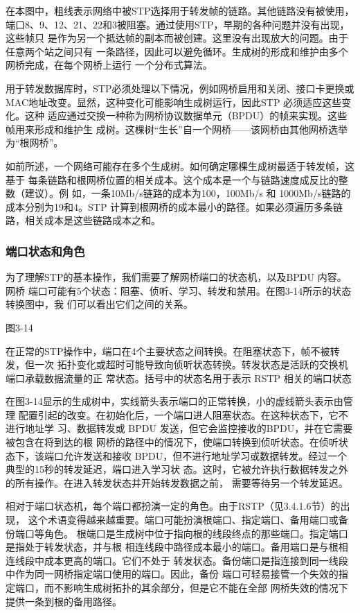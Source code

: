 在本图中，粗线表示网络中被STP选择用于转发帧的链路。其他链路没有被使用，
端口8、9、12、21、22和3被阻塞。通过使用STP，早期的各种问题并没有出现，这些帧只
是作为另一个抵达帧的副本而被创建。这里没有出现放大的问题。由于任意两个站之间只有
一条路径，因此可以避免循环。生成树的形成和维护由多个网桥完成，在每个网桥上运行
一个分布式算法。

用于转发数据库时，STP必须处理以下情况，例如网桥启用和关闭、接口卡更换或
MAC地址改变。显然，这种变化可能影响生成树运行，因此STP 必须适应这些变化。这种
适应通过交换一种称为网桥协议数据单元（BPDU）的帧来实现。这些帧用来形成和维护生
成树。这棵树“生长”自一个网桥——该网桥由其他网桥选举为“根网桥”。

如前所述，一个网络可能存在多个生成树。如何确定哪棵生成树最适于转发帧，这基于
每条链路和根网桥位置的相关成本。这个成本是一个与链路速度成反比的整数（建议）。例
如，一条10Mb/s链路的成本为100，100Mb/s 和 1000Mb/s链路的成本分别为19和4。STP
计算到根网桥的成本最小的路径。如果必须遍历多条链路，相关成本是这些链路成本之和。

\subsubsection{端口状态和角色}

为了理解STP的基本操作，我们需要了解网桥端口的状态机，以及BPDU 内容。网桥
端口可能有5个状态：阻塞、侦听、学习、转发和禁用。在图3-14所示的状态转换图中，我
们可以看出它们之间的关系。

图3-14

在正常的STP操作中，端口在4个主要状态之间转换。在阻塞状态下，帧不被转发，但一次
拓扑变化或超时可能导致向侦听状态转换。转发状态是活跃的交换机端口承载数据流量的正
常状态。括号中的状态名用于表示 RSTP 相关的端口状态

在图3-14显示的生成树中，实线箭头表示端口的正常转换，小的虚线箭头表示由管理
配置引起的改变。在初始化后，一个端口进人阻塞状态。在这种状态下，它不进行地址学
习、数据转发或 BPDU 发送，但它会监控接收的BPDU，并在它需要被包含在将到达的根
网桥的路径中的情况下，使端口转换到侦听状态。在侦听状态下，该端口允许发送和接收
BPDU，但不进行地址学习或数据转发。经过一个典型的15秒的转发延迟，端口进入学习状
态。这时，它被允许执行数据转发之外的所有操作。在进入转发状态并开始转发数据之前，
需要等待另一个转发延迟。

相对于端口状态机，每个端口都扮演一定的角色。由于RSTP（见3.4.1.6节）的出现，
这个术语变得越来越重要。端口可能扮演根端口、指定端口、备用端口或备份端口等角色。
根端口是生成树中位于指向根的线段终点的那些端口。指定端口是指处于转发状态，并与根
相连线段中路径成本最小的端口。备用端口是与根相连线段中成本更高的端口。它们不处于
转发状态。备份端口是指连接到同一线段中作为同一网桥指定端口使用的端口。因此，备份
端口可轻易接管一个失效的指定端口，而不影响生成树拓扑的其余部分，但是它不能在全部
网桥失效的情况下提供一条到根的备用路径。

